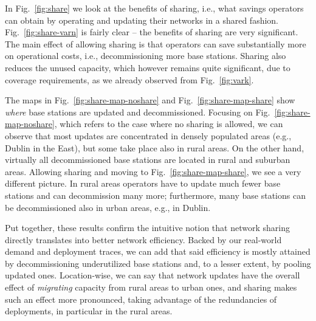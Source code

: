 \documentclass[10pt,journal,cspaper,compsoc]{IEEEtran}
\newcommand{\Fig}[1]{Fig.~\ref{fig:#1}}
\newcommand{\Eq}[1]{Eq.~(\ref{eq:#1})}
\begin{document}
In \Fig{share} we look at the benefits of sharing, i.e., what savings
operators can obtain by operating and updating their networks in a shared fashion.
\Fig{share-varn} is fairly clear -- the benefits of sharing are very significant.
The main effect of allowing sharing is that operators can save substantially more on operational costs,
i.e., decommissioning more base stations.
Sharing also reduces the unused capacity, which however remains quite significant, due to coverage requirements,
as we already observed from \Fig{vark}.

The maps in \Fig{share-map-noshare} and \Fig{share-map-share} show {\em where} base stations are
updated and decommissioned.
Focusing on \Fig{share-map-noshare}, which refers to the case where no sharing
is allowed, we can observe that most updates are concentrated in densely populated areas
(e.g., Dublin in the East), but some take place also in rural areas.
On the other hand, virtually all decommissioned base stations are located in rural and
suburban areas. 
Allowing sharing and moving to \Fig{share-map-share}, we see a very different picture.
In rural areas operators have to update much fewer base stations and can decommission many more;
furthermore,
many base stations can be decommissioned also in urban areas, e.g., in Dublin.

Put together, these results confirm the intuitive notion that network sharing directly translates into better network efficiency.
Backed by our real-world demand and deployment traces, we can add that said efficiency is mostly attained by decommissioning underutilized base stations and, to a lesser extent, by pooling updated ones.
Location-wise, we can say that network updates have the overall effect of {\em migrating} capacity from rural areas to urban ones, and sharing makes such an effect more pronounced, taking advantage of the redundancies of deployments, in particular in the rural areas.

\begin{figure*}[t]
\centering
{}
\caption{
Unused capacity and cost savings (as defined in \Eq{goal3})
as a function of~ with and without sharing (a);
location of updated and decommissioned base stations without (b) and with (c) sharing.
\label{fig:share}
}
\end{figure*}
\end{document}
